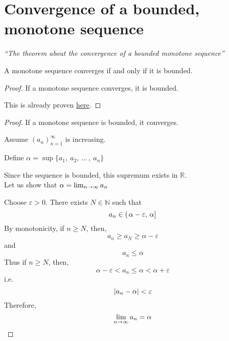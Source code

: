 \documentclass[12pt]{report}
\begin{document}
    \section{Convergence of a bounded, monotone sequence}
    \label{Convergence of a bounded, monotone sequence}
    \textit{``The theorem about the convergence of a bounded monotone sequence''} \vspace{3mm}
    \begin{theorem}
        A monotone sequence converges if and only if it is bounded.
    \end{theorem}
    \begin{proof}
        If a monotone sequence converges, it is bounded.
        
        This is already proven \hyperref[Convergence of a bounded sequence]{here}.
    \end{proof}
    \begin{proof}
        If a monotone sequence is bounded, it converges.
                
        Assume \(\left(a_n\right)^\infty _{n=1}\) is increasing.
        
        Define \(\alpha = \sup \{a_1,~ a_2, \, \dots \, , ~ a_n\}\)

        Since the sequence is bounded, this supremum exists in \(\mathbb{R}\).
        \vspace{5mm}
        \\
        Let us show that \(\alpha = \lim_{n \to \infty} a_n\)
        
        Choose \(\varepsilon > 0\). There exists \(N \in \mathbb{N}\) such that 
        \[a_n \in \left( \left. \alpha - \varepsilon, \, \alpha \right] \right.\]
        By monotonicity, if \(n \geq N\), then,
        \[a_n \geq a_N \geq \alpha - \varepsilon\]
        and
        \[a_n \leq \alpha\]
        Thus if \(n \geq N\), then,
        \[\alpha - \varepsilon < a_n \leq \alpha < \alpha + \varepsilon\]
        i.e.
        \[\left| a_n - \alpha \right| < \varepsilon\]
        Therefore,
        \[\lim_{n \to \infty} a_n = \alpha\]
    \end{proof} 
\end{document}
